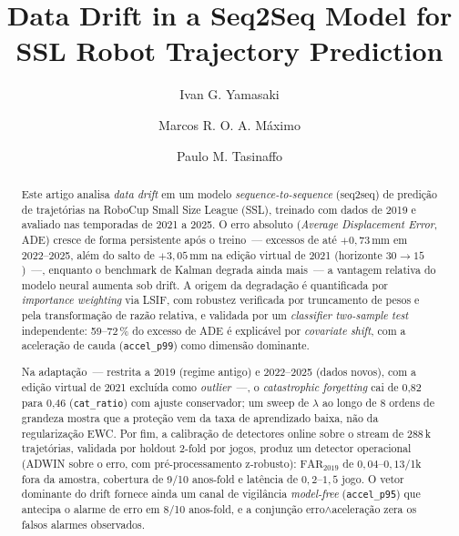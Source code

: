 \documentclass[runningheads]{llncs}
\begin{document}
\title{Data Drift in a Seq2Seq Model for SSL Robot Trajectory Prediction}

\author{Ivan G. Yamasaki \and
Marcos R. O. A. M\'aximo \and
Paulo M. Tasinaffo}
%
%
%
\maketitle

\begin{abstract}
Este artigo analisa \textit{data drift} em um modelo \textit{sequence-to-sequence} (seq2seq) de predi\c{c}\~ao de trajet\'orias na RoboCup Small Size League (SSL), treinado com dados de 2019 e avaliado nas temporadas de 2021 a 2025. O erro absoluto (\textit{Average Displacement Error}, ADE) cresce de forma persistente ap\'os o treino~--- excessos de at\'e $+0{,}73$\,mm em 2022--2025, al\'em do salto de $+3{,}05$\,mm na edi\c{c}\~ao virtual de 2021 (horizonte $30{\to}15$)~---, enquanto o benchmark de Kalman degrada ainda mais~--- a vantagem relativa do modelo neural aumenta sob drift. A origem da degrada\c{c}\~ao \'e quantificada por \textit{importance weighting} via LSIF, com robustez verificada por truncamento de pesos e pela transforma\c{c}\~ao de raz\~ao relativa, e validada por um \textit{classifier two-sample test} independente: 59--72\,\% do excesso de ADE \'e explic\'avel por \textit{covariate shift}, com a acelera\c{c}\~ao de cauda (\texttt{accel\_p99}) como dimens\~ao dominante.

Na adapta\c{c}\~ao~--- restrita a 2019 (regime antigo) e 2022--2025 (dados novos), com a edi\c{c}\~ao virtual de 2021 exclu\'ida como \emph{outlier}~---, o \textit{catastrophic forgetting} cai de 0{,}82 para 0{,}46 (\texttt{cat\_ratio}) com ajuste conservador; um sweep de $\lambda$ ao longo de 8 ordens de grandeza mostra que a prote\c{c}\~ao vem da taxa de aprendizado baixa, n\~ao da regulariza\c{c}\~ao EWC. Por fim, a calibra\c{c}\~ao de detectores online sobre o stream de 288\,k trajet\'orias, validada por holdout 2-fold por jogos, produz um detector operacional (ADWIN sobre o erro, com pr\'e-processamento z-robusto): $\mathrm{FAR}_{2019}$ de $0{,}04$--$0{,}13$/1k fora da amostra, cobertura de 9/10 anos-fold e lat\^encia de $0{,}2$--$1{,}5$ jogo. O vetor dominante do drift fornece ainda um canal de vigil\^ancia \emph{model-free} (\texttt{accel\_p95}) que antecipa o alarme de erro em 8/10 anos-fold, e a conjun\c{c}\~ao erro$\wedge$acelera\c{c}\~ao zera os falsos alarmes observados.
\end{abstract}
\end{document}
